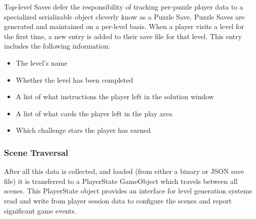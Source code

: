 Top-level Saves defer the responsibility of tracking per-puzzle player data to a specialized serializable object cleverly know as a Puzzle Save. Puzzle Saves are generated and maintained on a per-level basis. When a player visits a level for the first time, a new entry is added to their save file for that level. This entry includes the following information:
\begin{itemize}
    \item The level's name
    \item Whether the level has been completed
    \item A list of what instructions the player left in the solution window
    \item A list of what cards the player left in the play area
    \item Which challenge stars the player has earned
\end{itemize}

\subsubsection{Scene Traversal}
After all this data is collected, and loaded (from either a binary or JSON save file) it is transferred to a PlayerState GameObject which travels between all scenes. This PlayerState object provides an interface for level generation systems read and write from player session data to configure the scenes and report significant game events.